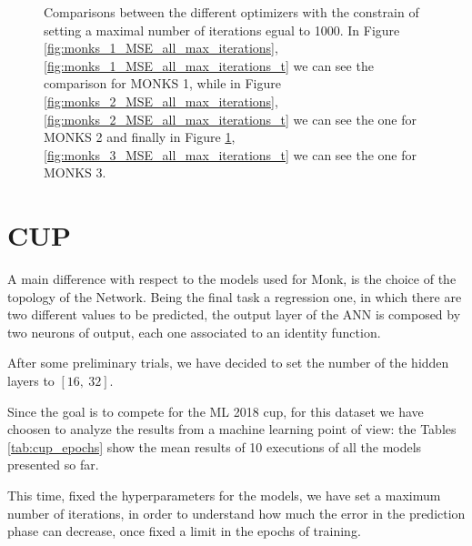\begin{figure}[t!]
\begin{subfigure}{0.45\textwidth}
{                    }
                    \caption{}
                    \label{fig:monks_3_MSE_all_max_iterations}
                \end{subfigure}
                \caption{Comparisons between the different optimizers with the constrain of setting a
                maximal number of iterations egual to 1000. In Figure \ref{fig:monks_1_MSE_all_max_iterations}, \ref{fig:monks_1_MSE_all_max_iterations_t}
                we can see the comparison for MONKS 1, while in Figure \ref{fig:monks_2_MSE_all_max_iterations}, \ref{fig:monks_2_MSE_all_max_iterations_t}
                we can see the one for MONKS 2 and finally in Figure \ref{fig:monks_3_MSE_all_max_iterations}, \ref{fig:monks_3_MSE_all_max_iterations_t} we
                can see the one for MONKS 3.}
                \label{fig:monks_MSE_all_max_iterations}
            \end{figure}


    \section{CUP} %
        \label{sec:cup}

        A main difference with respect to the models used for Monk, is the choice of the topology of the Network.
        Being the final task a regression one, in which there are two different values to be predicted, the output layer of the ANN is composed by two neurons of output, each one associated to an identity function.

        After some preliminary trials, we have decided to set the number of the hidden layers to $[16,\ 32]$.

        Since the goal is to compete for the ML 2018 cup, for this dataset we have choosen to analyze the results from a machine learning point of view: the Tables \ref{tab:cup_epochs} show the mean results of 10 executions of all the models presented so far.

        This time, fixed the hyperparameters for the models, we have set a maximum number of iterations, in order to understand how much the error in the prediction phase can decrease, once fixed a limit in the epochs of training. 


